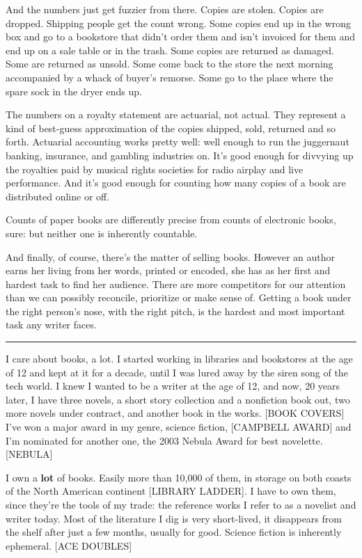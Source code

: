 And the numbers just get fuzzier from there. Copies are stolen.
Copies are dropped. Shipping people get the count wrong. Some
copies end up in the wrong box and go to a bookstore that didn't
order them and isn't invoiced for them and end up on a sale table
or in the trash. Some copies are returned as damaged. Some are
returned as unsold. Some come back to the store the next morning
accompanied by a whack of buyer's remorse. Some go to the place
where the spare sock in the dryer ends up.

The numbers on a royalty statement are actuarial, not actual. They
represent a kind of best-guess approximation of the copies shipped,
sold, returned and so forth. Actuarial accounting works pretty
well: well enough to run the juggernaut banking, insurance, and
gambling industries on. It's good enough for divvying up the
royalties paid by musical rights societies for radio airplay and
live performance. And it's good enough for counting how many copies
of a book are distributed online or off.

Counts of paper books are differently precise from counts of
electronic books, sure: but neither one is inherently countable.

And finally, of course, there's the matter of selling books.
However an author earns her living from her words, printed or
encoded, she has as her first and hardest task to find her
audience. There are more competitors for our attention than we can
possibly reconcile, prioritize or make sense of. Getting a book
under the right person's nose, with the right pitch, is the hardest
and most important task any writer faces.

\begin{center}\rule{3in}{0.4pt}\end{center}

I care about books, a lot. I started working in libraries and
bookstores at the age of 12 and kept at it for a decade, until I
was lured away by the siren song of the tech world. I knew I wanted
to be a writer at the age of 12, and now, 20 years later, I have
three novels, a short story collection and a nonfiction book out,
two more novels under contract, and another book in the works.
[BOOK COVERS] I've won a major award in my genre, science fiction,
[CAMPBELL AWARD] and I'm nominated for another one, the 2003 Nebula
Award for best novelette. [NEBULA]

I own a \textbf{lot} of books. Easily more than 10,000 of them, in
storage on both coasts of the North American continent [LIBRARY
LADDER]. I have to own them, since they're the tools of my trade:
the reference works I refer to as a novelist and writer today. Most
of the literature I dig is very short-lived, it disappears from the
shelf after just a few months, usually for good. Science fiction is
inherently ephemeral. [ACE DOUBLES]

